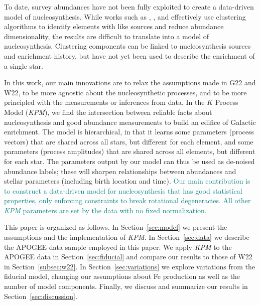 \documentclass[modern]{aastex631}
\newcommand{\add}[1]{\textcolor{teal}{#1}}
\newcommand{\name}{\textsl{KPM}}
\begin{document}
To date, survey abundances have not been fully exploited to create a data-driven model of nucleosynthesis. While works such as \citet{ting2012}, \citet{casey2019}, and \citet{ratcliffe2020} effectively use clustering algorithms to identify elements with like sources and reduce abundance dimensionality, the results are difficult to translate into a model of nucleosynthesis. Clustering components can be linked to nucleosynthesis sources and enrichment history, but have not yet been used to describe the enrichment of a single star.

In this work, our main innovations are to relax the assumptions made in G22 and W22, to be more agnostic about the nucleosynthetic processes, and to be more principled with the measurements or inferences from data.
In the $K$ Process Model (\name{}), we find the intersection between reliable facts about nucleosynthesis and good abundance measurements to build an edifice of Galactic enrichment.
The model is hierarchical, in that it learns some parameters (process vectors) that are shared across all stars, but different for each element, and some parameters (process amplitudes) that are shared across all elements, but different for each star.
The parameters output by our model can thus be used as de-noised abundance labels; these will sharpen relationships between abundances and stellar parameters (including birth location and time). \add{Our main contribution is to construct a data-driven model for nucleosynthesis that has good statistical properties, only enforcing constraints to break rotational degeneracies. All other \name{} parameters are set by the data with no fixed normalization.}

This paper is organized as follows. In Section~\ref{sec:model} we present the assumptions and the implementation of \name{}. In Section~\ref{sec:data} we describe the APOGEE data sample employed in this paper.  We apply \name{} to the APOGEE data in Section~\ref{sec:fiducial} and compare our results to those of W22 in Section~\ref{subsec:w22}. In Section~\ref{sec:variations} we explore variations from the fiducial model, changing our assumptions about Fe production as well as the number of model components. Finally, we discuss and summarize our results in Section~\ref{sec:discussion}.
\end{document}
